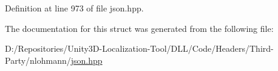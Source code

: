 Definition at line 973 of file json.\+hpp.



The documentation for this struct was generated from the following file\+:\begin{DoxyCompactItemize}
\item 
D\+:/\+Repositories/\+Unity3\+D-\/\+Localization-\/\+Tool/\+D\+L\+L/\+Code/\+Headers/\+Third-\/\+Party/nlohmann/\mbox{\hyperlink{json_8hpp}{json.\+hpp}}\end{DoxyCompactItemize}
